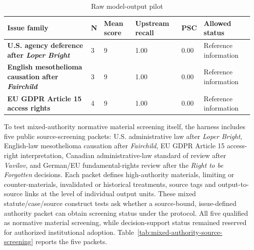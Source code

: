 \documentclass[12pt,a4paper]{article}
\begin{document}
\begin{table}[htbp]
\centering
\caption{Raw model-output pilot}
\label{tab:raw-model-output-pilot}
\small
\renewcommand{\arraystretch}{1.1}
\begin{tabularx}{\textwidth}{>{\bfseries}p{2.8cm}p{1.2cm}p{1.6cm}p{1.7cm}p{1.0cm}Y}
\toprule
Issue family & N & Mean score & Upstream recall & PSC & Allowed status \\
\midrule
U.S. agency deference after \textit{Loper Bright} & 3 & 9 & 1.00 & 0.00 & Reference information \\
English mesothelioma causation after \textit{Fairchild} & 3 & 9 & 1.00 & 0.00 & Reference information \\
EU GDPR Article 15 access rights & 4 & 9 & 1.00 & 0.00 & Reference information \\
\bottomrule
\end{tabularx}
\end{table}

To test mixed-authority normative material screening itself, the harness includes five public source-screening packets: U.S. administrative law after \textit{Loper Bright}, English-law mesothelioma causation after \textit{Fairchild}, EU GDPR Article 15 access-right interpretation, Canadian administrative-law standard of review after \textit{Vavilov}, and German/EU fundamental-rights review after the \textit{Right to be Forgotten} decisions. Each packet defines high-authority materials, limiting or counter-materials, invalidated or historical treatments, source tags and output-to-source links at the level of individual output units. These mixed statute/case/source construct tests ask whether a source-bound, issue-defined authority packet can obtain screening status under the protocol. All five qualified as normative material screening, while decision-support status remained reserved for authorized institutional adoption. Table~\ref{tab:mixed-authority-source-screening} reports the five packets.
\end{document}
